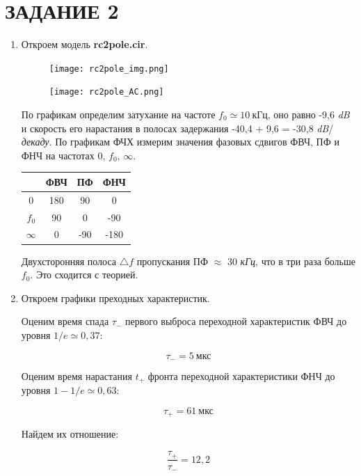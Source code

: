 \documentclass[a4paper, 12pt]{article}%
\begin{document}
\section*{ЗАДАНИЕ 2}

\begin{enumerate}

\item Откроем модель \textbf{rc2pole.cir}.

\begin{figure}[h!]
\centering
\texttt{[image: rc2pole\_img.png]}
\label{fig:Image1}
\end{figure}

\begin{figure}[h!]
\centering
\texttt{[image: rc2pole\_AC.png]}
\label{fig:Image1}
\end{figure}

По графикам определим затухание на частоте $f_0 \simeq 10 \: \textit{кГц}$, оно равно -9,6 \textit{dB} и скорость его нарастания в полосах задержания -40,4 + 9,6 = -30,8 \textit{dB}/\textit{декаду}. По графикам  ФЧХ измерим значения фазовых сдвигов  ФВЧ, ПФ и ФНЧ на частотах 0, $f_0$, $\infty$.

\begin{center}
\begin{tabular}{|c|c|c|c|}
\hline
 & ФВЧ & ПФ & ФНЧ \\
\hline
0 & 180 & 90 & 0 \\
\hline
$f_0$ & 90 & 0 & -90 \\
\hline
$\infty$ & 0 & -90 & -180 \\
\hline
\end{tabular}
\end{center}

Двухсторонняя полоса $\triangle f$ пропускания ПФ $\approx$ 30 \textit{кГц}, что в три раза больше $f_0$. Это сходится с теорией.

\item Откроем графики преходных характеристик.

Оценим время спада $\tau_-$ первого выброса переходной характеристик ФВЧ до уровня $1/e \simeq 0,37$:

\[\tau_-= 5 \: \textit{мкс}\]

Оценим время нарастания $t_+$ фронта переходной характеристики ФНЧ до уровня $1 - 1/e \simeq 0,63$:

\[\tau_+ = 61 \: \textit{мкс}\]

Найдем их отношение:

\[\frac{\tau_+}{\tau_-} = 12,2\]

\end{enumerate}
\end{document}
